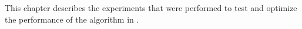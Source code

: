 This chapter describes
  the experiments that were performed
  to test and optimize
  the performance of the \corn{} algorithm in \dsea.
